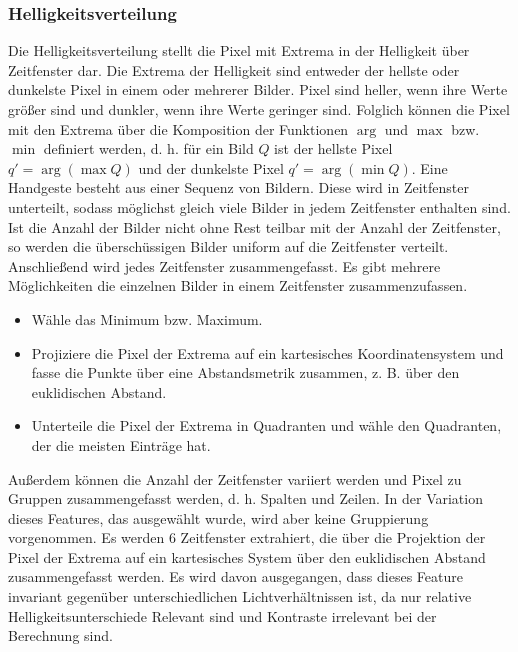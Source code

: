 \subsubsection{Helligkeitsverteilung}
Die Helligkeitsverteilung stellt die Pixel mit Extrema in der Helligkeit über Zeitfenster dar. Die Extrema der Helligkeit sind entweder der hellste oder dunkelste Pixel in einem oder mehrerer Bilder. Pixel
sind heller, wenn ihre Werte größer sind und dunkler, wenn ihre Werte geringer sind. Folglich können die Pixel mit den Extrema über die Komposition der Funktionen $\arg$ und $\max$ bzw. $\min$ definiert werden,
d. h. für ein Bild $Q$ ist der hellste Pixel $q' = \arg(\max Q)$ und der dunkelste Pixel $q' = \arg(\min Q)$.
\newline
\newline
Eine Handgeste besteht aus einer Sequenz von Bildern. Diese wird in Zeitfenster unterteilt, sodass möglichst gleich viele Bilder in jedem Zeitfenster enthalten sind. Ist die Anzahl der Bilder nicht ohne
Rest teilbar mit der Anzahl der Zeitfenster, so werden die überschüssigen Bilder uniform auf die Zeitfenster verteilt. Anschließend wird jedes Zeitfenster zusammengefasst. Es gibt mehrere Möglichkeiten
die einzelnen Bilder in einem Zeitfenster zusammenzufassen.
\begin{itemize}
    \item Wähle das Minimum bzw. Maximum.
    \item Projiziere die Pixel der Extrema auf ein kartesisches Koordinatensystem und fasse die Punkte über eine Abstandsmetrik zusammen, z. B. über den euklidischen Abstand.
    \item Unterteile die Pixel der Extrema in Quadranten und wähle den Quadranten, der die meisten Einträge hat.
\end{itemize}
Außerdem können die Anzahl der Zeitfenster variiert werden und Pixel zu Gruppen zusammengefasst werden, d. h. Spalten und Zeilen. In der Variation dieses Features, das ausgewählt wurde, wird aber
keine Gruppierung vorgenommen. Es werden 6 Zeitfenster extrahiert, die über die Projektion der Pixel der Extrema auf ein kartesisches System über den euklidischen Abstand zusammengefasst werden.
\newline
\newline
Es wird davon ausgegangen, dass dieses Feature invariant gegenüber unterschiedlichen Lichtverhältnissen ist, da nur relative Helligkeitsunterschiede Relevant sind und Kontraste irrelevant bei der
Berechnung sind.


